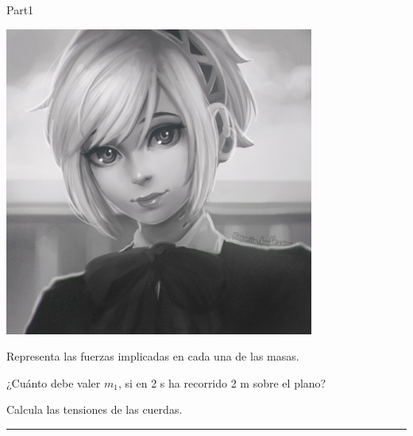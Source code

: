 \documentclass[9pt]{scrartcl}
\begin{document}
\begin{exam}{Part1}
\begin{onehalfspace}
\begin{problem*}[10ea]
\begin{minipage}{\linewidth}
\begin{varwidth}{0.5\linewidth}
\includegraphics[scale=0.4]{grafico5.jpg}
\end{varwidth}\hfill
\begin{varwidth}{0.5\linewidth}
\begin{parts}
\item  Representa las fuerzas implicadas en cada una de las masas.
\item ¿Cuánto debe valer $m_1$, si en 2 s ha recorrido 2 m sobre el plano?
\item Calcula las tensiones de las cuerdas.
\end{parts}
\end{varwidth}
\end{minipage}
\end{problem*}
\hrule
\end{onehalfspace}
\end{exam} 
\end{document}
